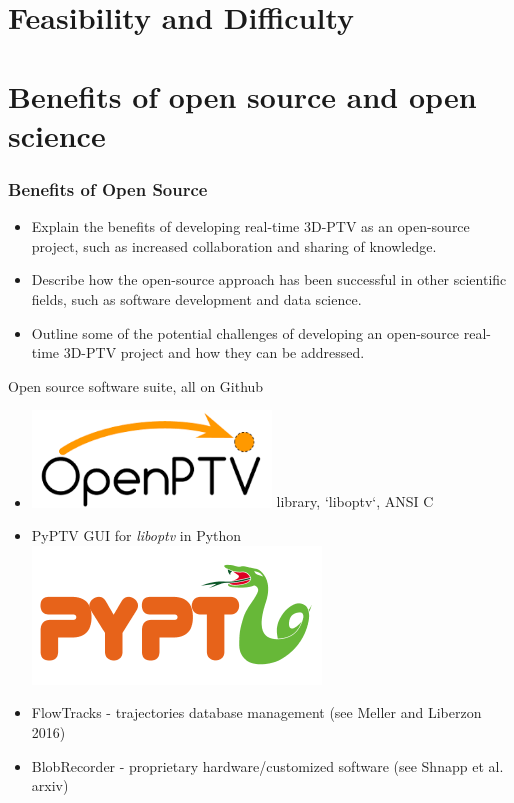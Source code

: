 \documentclass[aspectratio=43]{beamer}
\begin{document}
\section{Feasibility and Difficulty}




\section{Benefits of open source and open science}

\begin{frame}
\frametitle{Benefits of Open Source}
\begin{itemize}
\item Explain the benefits of developing real-time 3D-PTV as an open-source project, such as increased collaboration and sharing of knowledge.
\item Describe how the open-source approach has been successful in other scientific fields, such as software development and data science.
\item Outline some of the potential challenges of developing an open-source real-time 3D-PTV project and how they can be addressed.
\end{itemize}
\end{frame}


\begin{frame}{Open source software suite, all on Github}
\begin{itemize}
\item \includegraphics[width=0.5\textwidth]{openptv} \hspace{1em} library, `liboptv`, ANSI C
\item PyPTV GUI for {\em liboptv} in Python \includegraphics[width=.3\textwidth]{pyptv}
\item FlowTracks - trajectories database management (see Meller and Liberzon 2016)
\item BlobRecorder - proprietary hardware/customized software (see Shnapp et al. arxiv)
\end{itemize}
\end{frame}
\end{document}
